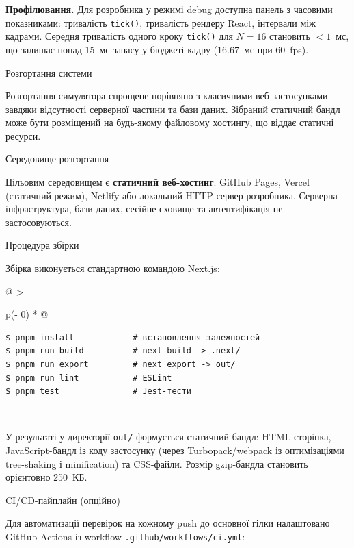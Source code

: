 \textbf{Профілювання.} Для розробника у режимі debug доступна панель з
часовими показниками: тривалість \texttt{tick()}, тривалість рендеру
React, інтервали між кадрами. Середня тривалість одного кроку
\texttt{tick()} для \(N = 16\) становить \(< 1\)~мс, що залишає понад
15~мс запасу у бюджеті кадру (16.67~мс при 60~fps).

\protect{}\label{_Toc229681152}{}Розгортання системи

Розгортання симулятора спрощене порівняно з класичними веб-застосунками
завдяки відсутності серверної частини та бази даних. Зібраний статичний
бандл може бути розміщений на будь-якому файловому хостингу, що віддає
статичні ресурси.

Середовище розгортання

Цільовим середовищем є \textbf{статичний веб-хостинг}: GitHub Pages,
Vercel (статичний режим), Netlify або локальний HTTP-сервер розробника.
Серверна інфраструктура, бази даних, сесійне сховище та автентифікація
не застосовуються.

Процедура збірки

Збірка виконується стандартною командою Next.js:

\begin{longtable}[]{@{}
  >{\raggedright\arraybackslash}p{}@{}}
\caption{Команди збірки та перевірки проєкту. Джерело: розроблено
автором.}\tabularnewline
\toprule\noalign{}
\endfirsthead
\endhead
\bottomrule\noalign{}
\endlastfoot
\begin{minipage}[t]{\linewidth}\raggedright
\begin{verbatim}
$ pnpm install            # встановлення залежностей
$ pnpm run build          # next build -> .next/
$ pnpm run export         # next export -> out/
$ pnpm run lint           # ESLint
$ pnpm test               # Jest-тести
\end{verbatim}
\end{minipage} \\
\end{longtable}

У результаті у директорії \texttt{out/} формується статичний бандл:
HTML-сторінка, JavaScript-бандл із коду застосунку (через
Turbopack/webpack із оптимізаціями tree-shaking і minification) та
CSS-файли. Розмір gzip-бандла становить орієнтовно 250~КБ.

CI/CD-пайплайн (опційно)

Для автоматизації перевірок на кожному push до основної гілки
налаштовано GitHub Actions із workflow
\texttt{.github/workflows/ci.yml}:


